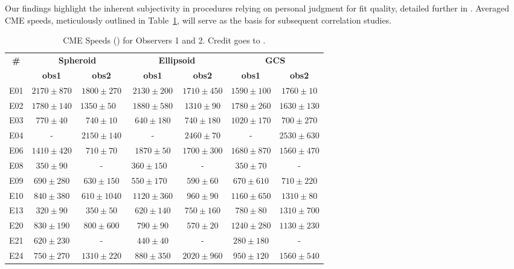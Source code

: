 Our findings highlight the inherent subjectivity in procedures relying on personal judgment for fit quality, detailed further in \citep{verbeke_2022}. Averaged CME speeds, meticulously outlined in Table~\ref{tab_fits}, will serve as the basis for subsequent correlation studies.

\begin{table}[!htp]
	\caption{CME Speeds (\kms) for Observers 1 and 2. Credit goes to \citet{miteva_2023}.}
	\label{tab_fits}
	\centering
	\begin{tabular}{ccccccc}
		\toprule
		\textbf{\#} & \multicolumn{2}{c}{\textbf{Spheroid}} & \multicolumn{2}{c}{\textbf{Ellipsoid}} & \multicolumn{2}{c}{\textbf{GCS}} \\
		& \textbf{obs1} & \textbf{obs2} & \textbf{obs1} & \textbf{obs2} & \textbf{obs1} & \textbf{obs2} \\
		\midrule
		E01 & $2170\pm870$ & $1800\pm270$ & $2130\pm200$ & $1710\pm450$ & $1590\pm100$ & $1760\pm10$ \\
		E02 & $1780\pm140$ & $1350\pm50$  & $1880\pm580$ & $1310\pm90$ & $1780\pm260$ & $1630\pm130$ \\
		E03 & $770\pm40$ & $740\pm10$ & $640\pm180$ & $740\pm180$ & $1020\pm170$ & $700\pm270$ \\
		E04 & - & $2150\pm140$ & - & $2460\pm70$ & - & $2530\pm630$ \\
		E06 & $1410\pm420$ & $710\pm70$ & $1870\pm50$ & $1700\pm300$ & $1680\pm870$ & $1560\pm470$ \\
		E08 & $350\pm90$ & - & $360\pm150$  & - & $350\pm70$ & - \\
		E09 & $690\pm280$ & $630\pm150$ & $550\pm170$  & $590\pm60$ & $670\pm610$ & $710\pm220$ \\
		E10 & $840\pm380$ & $610\pm1040$ & $1120\pm360$ & $960\pm90$ & $1160\pm650$ & $1310\pm80$ \\
		E13 & $320\pm90$ & $350\pm50$ & $620\pm140$ & $750\pm160$ & $780\pm80$ & $1310\pm700$ \\
		E20 & $830\pm190$ & $800\pm600$ & $790\pm90$ & $570\pm20$ & $1240\pm280$ & $1130\pm230$ \\
		E21 & $620\pm230$ & - & $440\pm40$ & - & $280\pm180$ & - \\
		E24 & $750\pm270$ & $1310\pm220$ & $880\pm350$ & $2020\pm960$ & $950\pm120$ & $1560\pm540$ \\
		\bottomrule
	\end{tabular}
\end{table}

